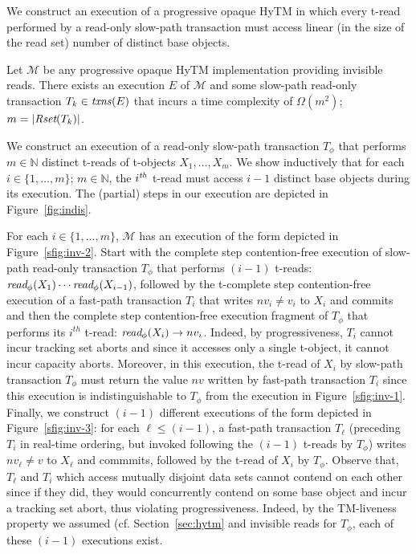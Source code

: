 We construct an execution of a progressive opaque HyTM in which every t-read performed by a read-only slow-path transaction
must access linear (in the size of the read set) number of distinct base objects.
%
\begin{theorem}
\label{th:impossibility}
Let $\mathcal{M}$ be any progressive opaque HyTM implementation providing invisible reads.
There exists an execution $E$ of $\mathcal{M}$ and some slow-path read-only transaction $T_k \in \ms{txns}(E)$
that incurs a time complexity of $\Omega (m^2)$; $m=|\textit{Rset}(T_k)|$.
\end{theorem}
%
\begin{proofsketch}
We construct an execution of a read-only slow-path transaction $T_{\phi}$ that performs $m \in \mathbb{N}$
distinct t-reads of t-objects $X_1,\ldots , X_m$. We show inductively that for each 
$i\in \{1,\ldots , m\}$; $m \in \mathbb{N}$, the $i^{\ms{th}}$ t-read must access $i-1$ distinct base objects
during its execution. The (partial) steps in our execution are depicted in Figure~\ref{fig:indis}.

For each $i\in \{1,\ldots , m\}$, $\mathcal{M}$ has an execution of the form depicted in Figure~\ref{sfig:inv-2}.
Start with the complete step contention-free execution of slow-path read-only transaction $T_{\phi}$ that performs
$(i-1)$ t-reads: $\textit{read}_{\phi}(X_1)\cdots \textit{read}_{\phi}(X_{i-1})$, followed by the t-complete step contention-free execution of a fast-path transaction $T_{i}$
that writes $nv_i\neq v_i$ to $X_i$ and commits and then the complete step contention-free execution fragment of $T_{\phi}$ that performs its $i^{th}$ t-read:
$\textit{read}_{\phi}(X_i) \rightarrow nv_i$. Indeed, by progressiveness, $T_i$ cannot incur tracking set aborts and since it accesses only a single t-object, it cannot incur capacity aborts.
Moreover, in this execution, the t-read of $X_i$ by slow-path transaction $T_{\phi}$ must return the value $nv$ written by fast-path transaction $T_i$ since this execution is indistinguishable
to $T_{\phi}$ from the execution in Figure~\ref{sfig:inv-1}. 
Finally, we construct $(i-1)$ different executions of the form depicted in Figure~\ref{sfig:inv-3}: for each $\ell \leq (i-1)$, 
a fast-path transaction $T_{\ell}$ (preceding $T_i$ in real-time ordering, but invoked following the $(i-1)$ t-reads by $T_{\phi}$) writes $nv_{\ell}\neq v$ to $X_{\ell}$ and commmits, followed by
the t-read of $X_i$ by $T_{\phi}$. Observe that, $T_{\ell}$ and $T_i$ which access mutually disjoint data sets cannot contend on each other since if they did, they would concurrently contend
on some base object and incur a tracking set abort, thus violating progressiveness.
Indeed, by the TM-liveness property we assumed (cf. Section~\ref{sec:hytm} and invisible reads for $T_{\phi}$, each of these $(i-1)$ executions exist. 


\end{proofsketch}
